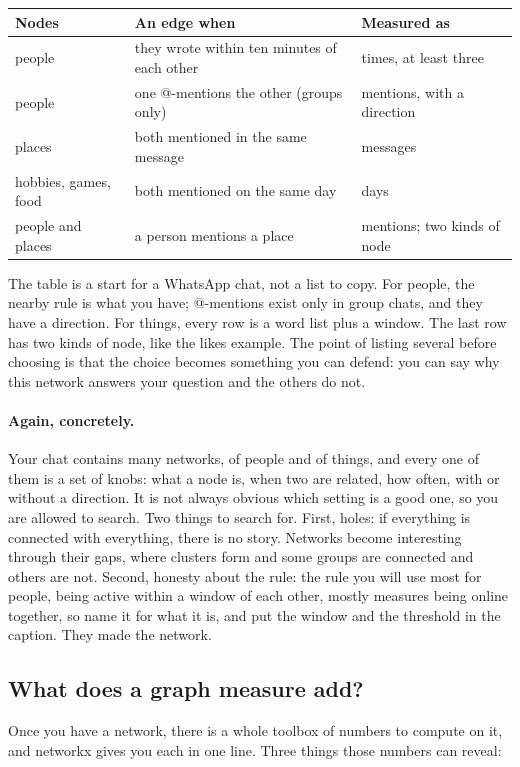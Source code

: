 \documentclass[12pt, a4paper]{article}
\theoremstyle{definition}
\theoremstyle{remark}
\newcommand{\againconcretely}{\paragraph{Again, concretely.}}
\begin{document}
\begin{table}[H]
\centering
\small
\begin{tabularx}{\textwidth}{@{}l X l@{}}
\toprule
\textbf{Nodes} & \textbf{An edge when} & \textbf{Measured as} \\
\midrule
people & they wrote within ten minutes of each other & times, at least three \\
people & one @-mentions the other (groups only) & mentions, with a direction \\
places & both mentioned in the same message & messages \\
hobbies, games, food & both mentioned on the same day & days \\
people and places & a person mentions a place & mentions; two kinds of node \\
\bottomrule
\end{tabularx}
\end{table}

The table is a start for a WhatsApp chat, not a list to copy. For people, the nearby rule is what you have; @-mentions exist only in group chats, and they have a direction. For things, every row is a word list plus a window. The last row has two kinds of node, like the likes example. The point of listing several before choosing is that the choice becomes something you can defend: you can say why this network answers your question and the others do not.

\againconcretely
Your chat contains many networks, of people and of things, and every one of them is a set of knobs: what a node is, when two are related, how often, with or without a direction. It is not always obvious which setting is a good one, so you are allowed to search. Two things to search for. First, holes: if everything is connected with everything, there is no story. Networks become interesting through their gaps, where clusters form and some groups are connected and others are not. Second, honesty about the rule: the rule you will use most for people, being active within a window of each other, mostly measures being online together, so name it for what it is, and put the window and the threshold in the caption. They made the network.

\subsection{What does a graph measure add?}
\label{sec:graph-measures}
Once you have a network, there is a whole toolbox of numbers to compute on it, and networkx gives you each in one line. Three things those numbers can reveal:
\end{document}
